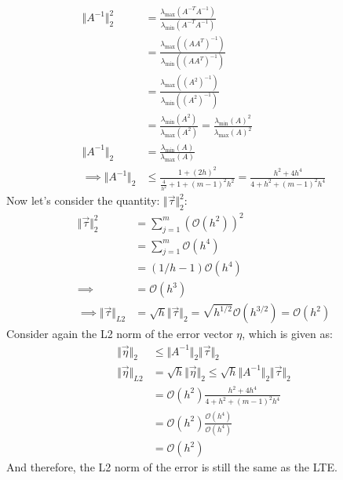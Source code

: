 \documentclass[]{article}
\begin{document}
        \begin{align*}\tag{2.b.3}\label{eqn:2.b.3}
            \Vert A^{-1}\Vert_2^2 &= 
            \frac{
                    \lambda_{\max}(A^{-T}A^{-1})
                }{
                    \lambda_{\min}(A^{-T}A^{-1})
                }
            \\
            &= \frac{
                \lambda_{\max}((AA^T)^{-1})
            }{
                \lambda_{\min}((AA^T)^{-1})
            }
            \\
            &= 
            \frac{\lambda_{\max}((A^2)^{-1})}
            {\lambda_{\min}((A^2)^{-1})}
            \\
            &= 
            \frac{\lambda_{\min}(A^2)}{\lambda_{\max}(A^2)} = 
            \frac{\lambda_{\min}(A)^2}{\lambda_{\max}(A)^2}
            \\
            \Vert A^{-1}\Vert_2 &= 
            \frac{\lambda_{\min}(A)}{\lambda_{\max}(A)}
            \\
            \implies 
            \Vert A^{-1}\Vert_2 &\le 
            \frac{1 + (2h)^2}{\frac{4}{h^2} + 1 + (m - 1)^2h^2}
            = 
            \frac{h^2 + 4h^4}{
                4 + h^2 + (m - 1)^2h^4
            }
        \end{align*}
        Now let's consider the quantity: $\Vert \vec{\tau}\Vert_2^2$: 
        \begin{align*}\tag{2.b.4}\label{eqn:2.b.4}
            \Vert \vec{\tau}\Vert_2^2 &= 
            \sum_{j = 1}^{m} (\mathcal{O}(h^2))^2
            \\
            &= \sum_{j = 1}^{m}
            \mathcal{O}(h^4)
            \\
            &= (1/h - 1)\mathcal{O}(h^4)
            \\
            \implies &= \mathcal{O}(h^3)
            \\
            \implies
            \Vert \vec{\tau}\Vert_{L2} &= \sqrt{h}\Vert \vec{\tau}\Vert_2
            = \sqrt{h^{1/2}}\mathcal{O}(h^{3/2}) = \mathcal{O}(h^2)
        \end{align*}
        Consider again the L2 norm of the error vector $\eta$, which is given as: 
        \begin{align*}\tag{2.b.5}\label{eqn:2.b.5}
            \Vert \vec{\eta}\Vert_2 &\le 
            \Vert A^{-1}\Vert_2\Vert \vec{\tau}\Vert_2
            \\
            \Vert \vec{\eta}\Vert_{L2} &= 
            \sqrt{h}\Vert \vec{\eta}\Vert_2\le 
            \sqrt{h}\Vert A^{-1}\Vert_2\Vert \vec{\tau}\Vert_2
            \\
            &= 
            \mathcal{O}(h^2)\frac{h^2 + 4h^4}{4 + h^2+ (m - 1)^2h^4}
            \\
            &= 
            \mathcal{O}(h^2)\frac{\mathcal{O}(h^4)}{\mathcal{O}(h^4)}
            \\
            &= \mathcal{O}(h^2)
        \end{align*}
        And therefore, the L2 norm of the error is still the same as the LTE. 
\end{document}
